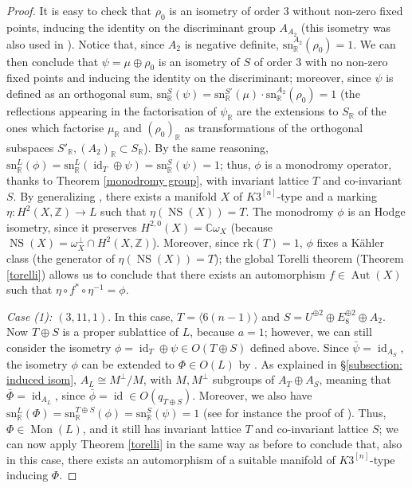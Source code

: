 \documentclass{amsart}
\theoremstyle{definition}
\newcommand{\ra}{\rightarrow}
\newcommand{\IZ}{\mathbb{Z}}
\newcommand{\rk}{\mathrm{rk}}
\newcommand{\spinn}{\mathrm{sn}_{\mathbb{R}}}
\newcommand{\hskn}{K3^{\left[n\right]}}
\DeclareMathOperator{\id}{id}
\DeclareMathOperator{\Mo}{Mon}
\DeclareMathOperator{\aut}{Aut}
\DeclareMathOperator{\ns}{NS}
\begin{document}
\begin{proof}
It is easy to check that $\rho_0$ is an isometry of order $3$ without non-zero fixed points, inducing the identity on the discriminant group $A_{A_2}$ (this isometry was also used in \cite[\S 6.6]{dolg_vangeem}). Notice that, since $A_2$ is negative definite, $\spinn^{A_2}(\rho_0) = 1$. We can then conclude that $\psi = \mu \oplus \rho_0$ is an isometry of $S$ of order $3$ with no non-zero fixed points and inducing the identity on the discriminant; moreover, since $\psi$ is defined as an orthogonal sum, $\spinn^S(\psi) = \spinn^{S'}(\mu) \cdot \spinn^{A_2}(\rho_0) = 1$ (the reflections appearing in the factorisation of $\psi_\mathbb{R}$ are the extensions to $S_\mathbb{R}$ of the ones which factorise $\mu_\mathbb{R}$ and $\left(\rho_0\right)_\mathbb{R}$ as transformations of the orthogonal subspaces $S'_\mathbb{R}, \left(A_2\right)_\mathbb{R} \subset S_\mathbb{R}$). By the same reasoning, $\spinn^{L}(\phi) = \spinn^{L}(\id_T \oplus \psi) = \spinn^{S}(\psi) = 1$; thus, $\phi$ is a monodromy operator, thanks to Theorem \ref{monodromy group}, with invariant lattice $T$ and co-invariant $S$. By generalizing \cite[Proposition 5.3]{bcs}, there exists a manifold $X$ of $\hskn$-type and a marking $\eta: H^2(X,\IZ) \ra L$ such that $\eta(\ns(X)) = T$. The monodromy $\phi$ is an Hodge isometry, since it preserves $H^{2,0}(X) = \mathbb{C}\omega_{X}$ (because $\ns(X) = \omega_X^{\perp} \cap H^2(X, \IZ)$). Moreover, since $\rk(T) = 1$, $\phi$ fixes a K\"ahler class (the generator of $\eta(\ns(X)) = T$); the global Torelli theorem (Theorem \ref{torelli}) allows us to conclude that there exists an automorphism $f \in \aut(X)$ such that $\eta \circ f^* \circ \eta^{-1}= \phi$.

\emph{Case (1): $(3,11,1)$}. In this case, $T=\langle 6(n-1) \rangle$ and $S = U^{\oplus 2} \oplus E_8^{\oplus 2} \oplus A_2$. Now $T \oplus S$ is a proper sublattice of $L$, because $a = 1$; however, we can still consider the isometry $\phi = \id_T \oplus \psi \in O(T \oplus S)$ defined above. Since $\bar{\psi} = \id_{A_S}$, the isometry $\phi$ can be extended to $\Phi \in O(L)$ by \cite[Corollary 1.5.2]{nikulin}. As explained in \S \ref{subsection: induced isom}, $A_L \cong M^\perp/M$, with $M,M^\perp$ subgroups of $A_T \oplus A_S$, meaning that $\bar{\Phi} = \id_{A_L}$, since $\bar{\phi} = \id \in O(q_{T \oplus S})$. Moreover, we also have $\spinn^{L}(\Phi) = \spinn^{T\oplus S}(\phi) = \spinn^S(\psi) = 1$ (see for instance the proof of \cite[Proposition 3.5]{camere_fourier}). Thus, $\Phi \in \Mo(L)$, and it still has invariant lattice $T$ and co-invariant lattice $S$; we can now apply Theorem \ref{torelli} in the same way as before to conclude that, also in this case, there exists an automorphism of a suitable manifold of $\hskn$-type inducing $\Phi$.  


\end{proof}
\end{document}
